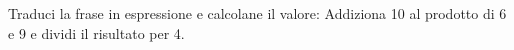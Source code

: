 \item Traduci la frase in espressione e calcolane il valore: Addiziona 10 al prodotto di 6 e 9 e dividi il risultato per 4.